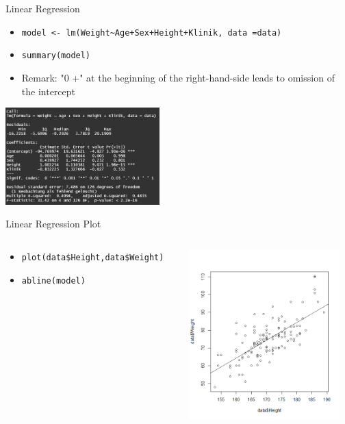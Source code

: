 \documentclass[aspectratio = 169]{chariteBeamer}
\begin{document}
\begin{frame}[fragile]{Linear Regression}
	\begin{itemize}
		\item \verb"model <- lm(Weight~Age+Sex+Height+Klinik, data =data)"
		\item \verb+summary(model)+
		\item Remark: "0 +" at the beginning of the right-hand-side leads to omission of the intercept
	\end{itemize}
			
	\begin{center}
		\includegraphics[height=3.75cm]{LinearRegressionSummary}
	\end{center}
\end{frame}

\begin{frame}[fragile]{Linear Regression Plot}
	\begin{columns}[T]
		\begin{column}{0.6\textwidth}
			\begin{itemize}
				\item \verb+plot(data$Height,data$Weight)+
				\item \verb+abline(model)+
			\end{itemize}
		\end{column}
		\begin{column}{0.4\textwidth}
			\includegraphics[height=6.5cm]{LinearRegressionPlot}
		\end{column}
	\end{columns}
\end{frame}
\end{document}

